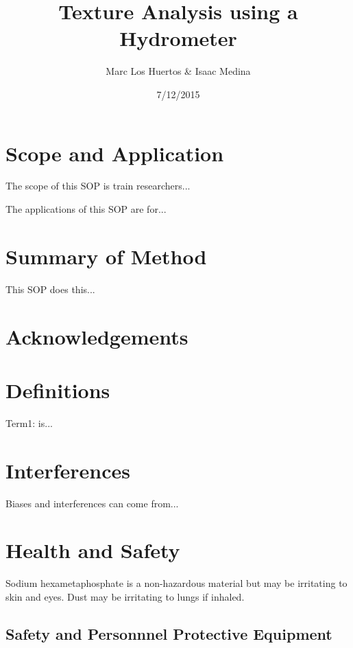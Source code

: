 \documentclass[12pt]{../SOP3_alpha}
\title{Texture Analysis using a Hydrometer}
\date{7/12/2015}
\author{Marc Los Huertos \& Isaac Medina}
\begin{document}


\maketitle

\section{Scope and Application}

\NP The scope of this SOP is train researchers...

\NP The applications of this SOP are for...

\section{Summary of Method}

\NP This SOP does this...

\tableofcontents

\newpage

\section{Acknowledgements}

\section{Definitions}

\NP Term1: is...

\section{Interferences}

\NP Biases and interferences can come from...

\section{Health and Safety}

\NP Sodium hexametaphosphate is a non-hazardous material but may be irritating to skin and eyes. Dust may be irritating to lungs if inhaled. 

\subsection*{Safety and Personnnel Protective Equipment}
\end{document}
